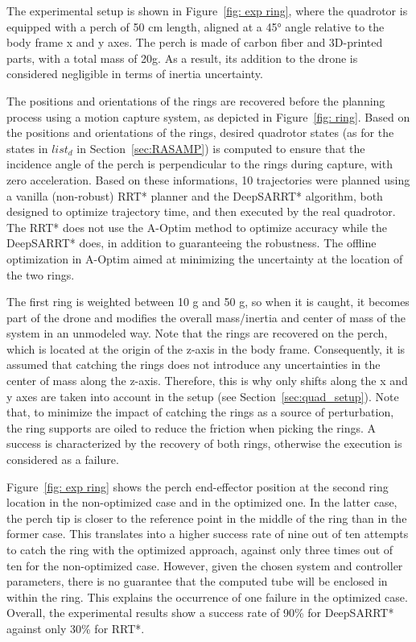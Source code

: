 The experimental setup is shown in Figure~\ref{fig: exp ring}, where the quadrotor is equipped with a perch of 50 cm length, aligned at a 45° angle relative to the body frame x and y axes.
The perch is made of carbon fiber and 3D-printed parts, with a total mass of 20g. 
As a result, its addition to the drone is considered negligible in terms of inertia uncertainty.

The positions and orientations of the rings are recovered before the planning process using a motion capture system, as depicted in Figure~\ref{fig: ring}.
Based on the positions and orientations of the rings, desired quadrotor states (as for the states in $list_{d}$ in Section~\ref{sec:RASAMP}) is computed to ensure that the incidence angle of the perch is perpendicular to the rings during capture, with zero acceleration.
Based on these informations, 10 trajectories were planned using a vanilla (non-robust) RRT* planner and the DeepSARRT* algorithm, both designed to optimize trajectory time, and then executed by the real quadrotor.
The RRT* does not use the A-Optim method to optimize accuracy while the DeepSARRT* does, in addition to guaranteeing the robustness.
The offline optimization in A-Optim aimed at minimizing the uncertainty at the location of the two rings.

The first ring is weighted between 10 g and 50 g, so when it is caught, it becomes part of the drone and modifies the overall mass/inertia and center of mass of the system in an unmodeled way. 
Note that the rings are recovered on the perch, which is located at the origin of the z-axis in the body frame. 
Consequently, it is assumed that catching the rings does not introduce any uncertainties in the center of mass along the z-axis. 
Therefore, this is why only shifts along the x and y axes are taken into account in the setup (see Section~\ref{sec:quad_setup}).
Note that, to minimize the impact of catching the rings as a source of perturbation, the ring supports are oiled to reduce the friction when picking the rings.
A success is characterized by the recovery of both rings, otherwise the execution is considered as a failure.

Figure~\ref{fig: exp ring} shows the perch end-effector position at the second ring location in the non-optimized case and in the optimized one. 
In the latter case, the perch tip is closer to the reference point in the middle of the ring than in the former case. 
This translates into a higher success rate of nine out of ten attempts to catch the ring with the optimized approach, against only three times out of ten for the non-optimized case.
However, given the chosen system and controller parameters, there is no guarantee that the computed tube will be enclosed in within the ring.
This explains the occurrence of one failure in the optimized case.
Overall, the experimental results show a success rate of 90\% for DeepSARRT* against only 30\% for RRT*.

